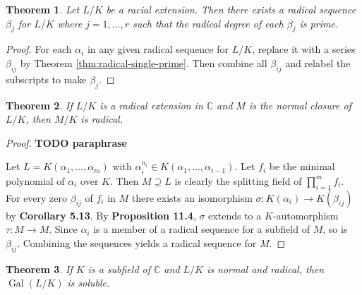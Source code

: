 \documentclass[12pt]{article}
\newtheorem{theorem}{Theorem}
\newcommand{\Gal}{\operatorname{Gal}}
\begin{document}
\begin{theorem} \label{thm:radical-all-prime}
    Let $L / K$ be a racial extension. Then there exists a radical sequence $\beta_j$ for $L / K$ where $j=1, \dots, r$ such that the radical degree of each $\beta_j$ is prime.
\end{theorem}

\begin{proof}
    For each $\alpha_i$ in any given radical sequence for $L / K$, replace it with a series $\beta_{ij}$ by Theorem \ref{thm:radical-single-prime}. Then combine all $\beta_{ij}$ and relabel the subscripts to make $\beta_{j}$. 
\end{proof}

\begin{theorem} \label{thm:radical-closure}
    If $L / K$ is a radical extension in $\mathbb{C}$ and $M$ is the normal closure of $L / K$, then $M / K$ is radical.
\end{theorem}

\begin{proof}
\textbf{TODO paraphrase}

Let $L=K\left(\alpha_1, \ldots, \alpha_m\right)$ with $\alpha_i^{n_i} \in K\left(\alpha_1, \ldots, \alpha_{i-1}\right)$. Let $f_i$ be the minimal polynomial of $\alpha_i$ over $K$. Then $M \supseteq L$ is clearly the splitting field of $\prod_{i=1}^m f_i$. For every zero $\beta_{i j}$ of $f_i$ in $M$ there exists an isomorphism $\sigma : K\left(\alpha_i\right) \rightarrow K\left(\beta_{i j}\right)$ by \textbf{Corollary 5.13}. By \textbf{Proposition 11.4}, $\sigma$ extends to a $K$-automorphism $\tau: M \rightarrow M$. Since $\alpha_i$ is a member of a radical sequence for a subfield of $M$, so is $\beta_{i j}$. Combining the sequences yields a radical sequence for $M$.
\end{proof}


\begin{theorem} \label{thm:radical-3}
If $K$ is a subfield of $\mathbb{C}$ and $L / K$ is normal and radical, then $\Gal(L / K)$ is soluble.
\end{theorem}
\end{document}
